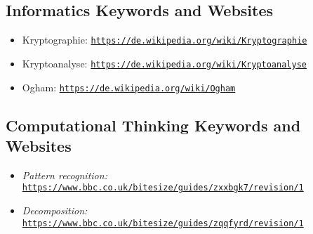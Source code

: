\documentclass[a4paper,11pt]{report}
\newcommand{\BrochureUrlText}[1]{\texttt{#1}}
\begin{document}
\subsection*{Informatics Keywords and Websites}

\begin{itemize}
  \item Kryptographie: \href{https://de.wikipedia.org/wiki/Kryptographie}{\BrochureUrlText{https://de.wikipedia.org/wiki/Kryptographie}}
  \item Kryptoanalyse: \href{https://de.wikipedia.org/wiki/Kryptoanalyse}{\BrochureUrlText{https://de.wikipedia.org/wiki/Kryptoanalyse}}
  \item Ogham: \href{https://de.wikipedia.org/wiki/Ogham}{\BrochureUrlText{https://de.wikipedia.org/wiki/Ogham}}
\end{itemize}


\subsection*{Computational Thinking Keywords and Websites}

\begin{itemize}
  \item \emph{Pattern recognition:} \href{https://www.bbc.co.uk/bitesize/guides/zxxbgk7/revision/1}{\BrochureUrlText{https://www.bbc.co.uk/bitesize/guides/zxxbgk7/revision/1}}
  \item \emph{Decomposition:} \href{https://www.bbc.co.uk/bitesize/guides/zqqfyrd/revision/1}{\BrochureUrlText{https://www.bbc.co.uk/bitesize/guides/zqqfyrd/revision/1}}
\end{itemize}
\end{document}
